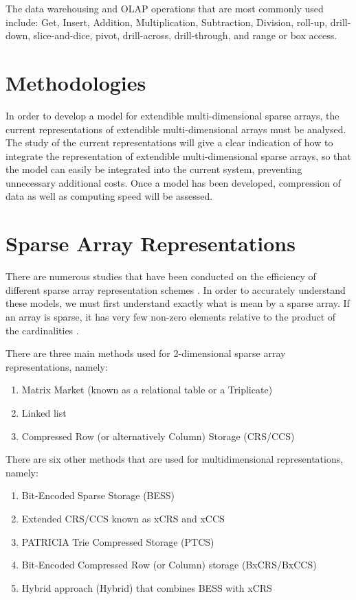 The data warehousing and OLAP operations that are most commonly used include: Get, Insert, Addition, Multiplication, Subtraction, Division, roll-up, drill-down, slice-and-dice, pivot, drill-across, drill-through, and range or box access.

\section{Methodologies}
In order to develop a model for extendible multi-dimensional sparse arrays, the current representations of extendible multi-dimensional arrays must be analysed. The study of the current representations will give a clear indication of how to integrate the representation of extendible multi-dimensional sparse arrays, so that the model can easily be integrated into the current system, preventing unnecessary additional costs. Once a model has been developed, compression of data as well as computing speed will be assessed.

\section{Sparse Array Representations}
There are numerous studies that have been conducted on the efficiency of different sparse array representation schemes \cite{wang:2014sar,goil:bess}. In order to accurately understand these models, we must first understand exactly what is mean by a sparse array. If an array is sparse, it has very few non-zero elements relative to the product of the cardinalities \cite{wang:2014sar}.

There are three main methods used for 2-dimensional sparse array representations, namely: 
\begin{enumerate}
	\item Matrix Market (known as a relational table or a Triplicate)
	\item Linked list
	\item Compressed Row (or alternatively Column) Storage (CRS/CCS)
\end{enumerate}	

There are six other methods that are used for multidimensional representations, namely: 
\begin{enumerate}
	\item Bit-Encoded Sparse Storage (BESS) 
	\item Extended CRS/CCS known as xCRS and xCCS
	\item PATRICIA Trie Compressed Storage (PTCS)
	\item Bit-Encoded Compressed Row (or Column) storage (BxCRS/BxCCS)
	\item Hybrid approach (Hybrid) that combines BESS with xCRS
\end{enumerate}


